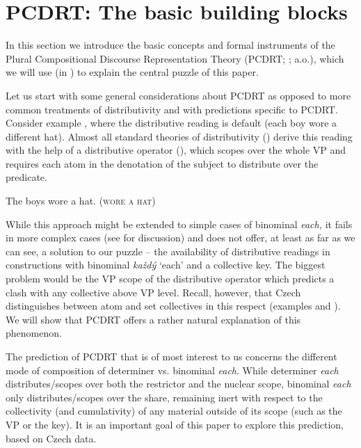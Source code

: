 \documentclass[output=paper,colorlinks,citecolor=brown,newtxmath]{langscibook}
\begin{document}
\section{PCDRT: The basic building blocks}\label{pcdrt}

In this section we introduce the basic concepts and formal instruments of the Plural Compositional Discourse Representation Theory (PCDRT; \citealt{Brasoveanu2008,Dotlacil2013}; a.o.), which we will use (in ) to explain the central puzzle of this paper.

Let us start with some general considerations about PCDRT as opposed to more common treatments of distributivity and with predictions specific to PCDRT. Consider example , where the distributive reading is default (each boy wore a different hat). Almost all standard theories of distributivity (\citealt{Bennett1974,Link1983,Schwarzschild1996,Winter2002}) derive this reading with the help of a distributive operator (), which scopes over the whole VP and requires each atom in the denotation of the subject to distribute over the predicate.

\ea\ea\label{ex:line375} The boys wore a hat.
\ex \label{ex:line375-a} (\textsc{wore a hat})
\z\z

\noindent While this approach might be extended to simple cases of binominal \textit{each,} it fails in more complex cases (see \citealt{Dotlacil2012} for discussion) and does not offer, at least as far as we can see, a solution to our puzzle -- the availability of distributive readings in constructions with binominal \textit{každý} `each' and a collective key. The biggest problem would be the VP scope of the distributive operator which predicts a clash with any collective above VP level. Recall, however, that Czech distinguishes between atom and set collectives in this respect (examples  and ).  We will show that PCDRT offers a rather natural explanation of this phenomenon.

The prediction of PCDRT that is of most interest to us concerns the different mode of composition of determiner vs. binominal \textit{each}. While determiner \textit{each} distributes/scopes over both the restrictor and the nuclear scope, binominal \textit{each} only distributes/scopes over the share, remaining inert with respect to the collectivity (and cumulativity) of any material outside of its scope (such as the VP or the key). It is an important goal of this paper to explore this prediction, based on Czech data.
\end{document}
